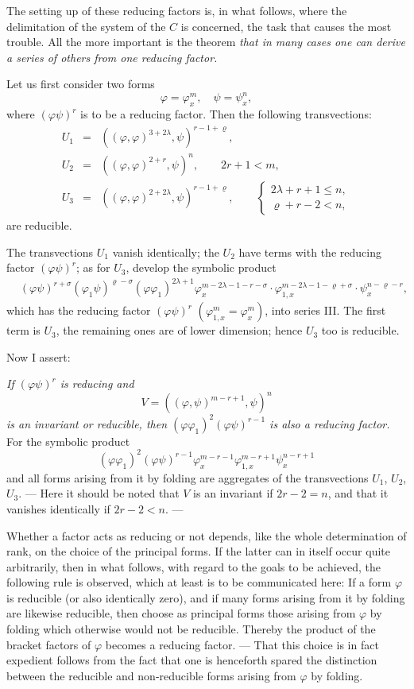 \documentclass[10pt]{article}
\begin{document}
The setting up of these reducing factors is, in what follows, where the delimitation of the system of the $C$ is concerned, the task that causes the most trouble. All the more important is the theorem \emph{that in many cases one can derive a series of others from one reducing factor.}

Let us first consider two forms
\[
\varphi=\varphi_x^m,\quad \psi=\psi_x^n,
\]
where $(\varphi\psi)^r$ is to be a reducing factor. Then the following transvections:
\[
\begin{array}{rcl}
U_1&=&((\varphi,\varphi)^{3+2\lambda},\psi)^{r-1+\varrho},\\[0.25em]
U_2&=&((\varphi,\varphi)^{2+r},\psi)^n,\qquad 2r+1<m,\\[0.25em]
U_3&=&((\varphi,\varphi)^{2+2\lambda},\psi)^{r-1+\varrho},\qquad
\left\{\begin{array}{l}2\lambda+r+1\leq n,\\ \varrho+r-2<n,
\end{array}\right.
\end{array}
\]
are reducible.

The transvections $U_1$ vanish identically; the $U_2$ have terms with the reducing factor $(\varphi\psi)^r$; as for $U_3$, develop the symbolic product
\[
\begin{aligned}
&(\varphi\psi)^{r+\sigma}(\varphi_1\psi)^{\varrho-\sigma}(\varphi\varphi_1)^{2\lambda+1}\varphi_x^{m-2\lambda-1-r-\sigma}\cdot\varphi_{1,x}^{m-2\lambda-1-\varrho+\sigma}\cdot\psi_x^{n-\varrho-r},
\end{aligned}
\]
which has the reducing factor $(\varphi\psi)^r$ $(\varphi_{1,x}^m=\varphi_x^m)$, into series III. The first term is $U_3$, the remaining ones are of lower dimension; hence $U_3$ too is reducible.

Now I assert:

\emph{If $(\varphi\psi)^r$ is reducing and}
\[
V=((\varphi,\psi)^{m-r+1},\psi)^n
\]
\emph{is an invariant or reducible, then $(\varphi\varphi_1)^2(\varphi\psi)^{r-1}$ is also a reducing factor.} For the symbolic product
\[
(\varphi\varphi_1)^2(\varphi\psi)^{r-1}\varphi_x^{m-r-1}\varphi_{1,x}^{m-r+1}\psi_x^{n-r+1}
\]
and all forms arising from it by folding are aggregates of the transvections $U_1$, $U_2$, $U_3$. --- Here it should be noted that $V$ is an invariant if $2r-2=n$, and that it vanishes identically if $2r-2<n$. ---

Whether a factor acts as reducing or not depends, like the whole determination of rank, on the choice of the principal forms. If the latter can in itself occur quite arbitrarily, then in what follows, with regard to the goals to be achieved, the following rule is observed, which at least is to be communicated here: If a form $\varphi$ is reducible (or also identically zero), and if many forms arising from it by folding are likewise reducible, then choose as principal forms those arising from $\varphi$ by folding which otherwise would not be reducible. Thereby the product of the bracket factors of $\varphi$ becomes a reducing factor. --- That this choice is in fact expedient follows from the fact that one is henceforth spared the distinction between the reducible and non-reducible forms arising from $\varphi$ by folding.
\end{document}
